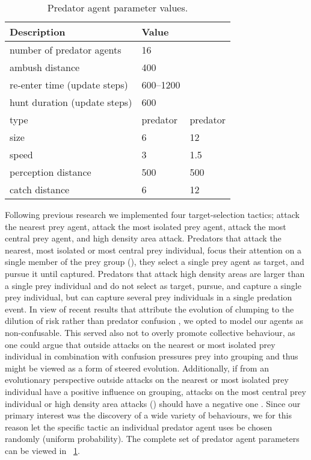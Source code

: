 \begin{table}
	\caption{Predator agent parameter values.}
	\label{tab:predator}
	\begin{tabular}{lll}
		\toprule
		Description & Value \\
		\midrule
		number of predator agents & 16 \\
		ambush distance & 400 \\
		re-enter time (update steps) & 600--\num{1200} \\
		hunt duration (update steps) & 600 \\
		\hdashline
		type & \ST predator & \HDA predator \\
		size & 6 & 12\\
		speed & 3 & \num{1.5}\\
		perception distance & 500 & 500 \\
		catch distance & 6 & 12\\
		\bottomrule
	\end{tabular}
\end{table}

Following previous research \cite{demsar2014simulated,demsar2015simulating,olson2016evolution} we implemented four target-selection tactics; attack the nearest prey agent, attack the most isolated prey agent, attack the most central prey agent, and high density area attack. Predators that attack the nearest, most isolated or most central prey individual, focus their attention on a single member of the prey group (\ST), \ie they select a single prey agent as target, and pursue it until captured. Predators that attack high density areas are larger than a single prey individual and do not select as target, pursue, and capture a single prey individual, but can capture several prey individuals in a single predation event. In view of recent results that attribute the evolution of clumping to the dilution of risk \cite{biswas2014causes} rather than predator confusion \cite{olson2013predator}, we opted to model our agents as non-confusable. This served also not to overly promote collective behaviour, as one could argue that outside attacks on the nearest or most isolated prey individual in combination with confusion pressures prey into grouping and thus might be viewed as a form of steered evolution. Additionally, if from an evolutionary perspective outside attacks on the nearest or most isolated prey individual have a positive influence on grouping, attacks on the most central prey individual or high density area attacks (\HDA) should have a negative one \cite{olson2016evolution}. Since our primary interest was the discovery of a wide variety of behaviours, we for this reason let the specific tactic an individual predator agent uses be chosen randomly (uniform probability). The complete set of predator agent parameters can be viewed in \tablename~\ref{tab:predator}.

